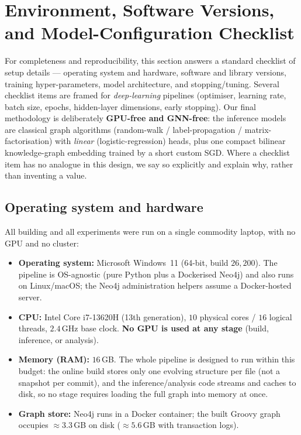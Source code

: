 	\section{Environment, Software Versions, and Model-Configuration Checklist}
	\label{sec:setup-checklist}
	For completeness and reproducibility, this section answers a standard checklist of
	setup details --- operating system and hardware, software and library versions,
	training hyper-parameters, model architecture, and stopping/tuning. Several checklist
	items are framed for \emph{deep-learning} pipelines (optimiser, learning rate, batch
	size, epochs, hidden-layer dimensions, early stopping). Our final methodology is
	deliberately \textbf{GPU-free and GNN-free}: the inference models are classical
	graph algorithms (random-walk / label-propagation / matrix-factorisation) with
	\emph{linear} (logistic-regression) heads, plus one compact bilinear knowledge-graph
	embedding trained by a short custom SGD. Where a checklist item has no analogue in
	this design, we say so explicitly and explain why, rather than inventing a value.

	\subsection{Operating system and hardware}
	\label{sec:setup-hw}
	All building and all experiments were run on a single commodity laptop, with no GPU
	and no cluster:
	\begin{itemize}[nosep,leftmargin=1.4em]
		\item \textbf{Operating system:} Microsoft Windows~11 (64-bit, build $26{,}200$).
		The pipeline is OS-agnostic (pure Python plus a Dockerised Neo4j) and also runs on
		Linux/macOS; the Neo4j administration helpers assume a Docker-hosted server.
		\item \textbf{CPU:} Intel Core i7-13620H (13th generation), $10$ physical cores /
		$16$ logical threads, $2.4$\,GHz base clock. \textbf{No GPU is used at any stage}
		(build, inference, or analysis).
		\item \textbf{Memory (RAM):} $16$\,GB. The whole pipeline is designed to run within
		this budget: the online build stores only one evolving structure per file (not a
		snapshot per commit), and the inference/analysis code streams and caches to disk, so
		no stage requires loading the full graph into memory at once.
		\item \textbf{Graph store:} Neo4j runs in a Docker container; the built Groovy graph
		occupies $\approx\!3.3$\,GB on disk ($\approx\!5.6$\,GB with transaction logs).
	\end{itemize}

